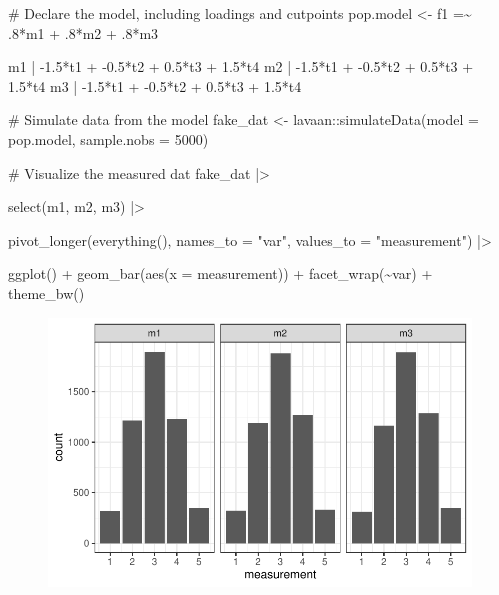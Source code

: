 \documentclass[
  letterpaper,
  DIV=11,
  numbers=noendperiod]{scrreprt}
\newenvironment{Shaded}{\begin{snugshade}}{\end{snugshade}}
\newcommand{\AttributeTok}[1]{\textcolor[rgb]{0.40,0.45,0.13}{#1}}
\newcommand{\CommentTok}[1]{\textcolor[rgb]{0.37,0.37,0.37}{#1}}
\newcommand{\DecValTok}[1]{\textcolor[rgb]{0.68,0.00,0.00}{#1}}
\newcommand{\FunctionTok}[1]{\textcolor[rgb]{0.28,0.35,0.67}{#1}}
\newcommand{\NormalTok}[1]{\textcolor[rgb]{0.00,0.23,0.31}{#1}}
\newcommand{\OtherTok}[1]{\textcolor[rgb]{0.00,0.23,0.31}{#1}}
\newcommand{\SpecialCharTok}[1]{\textcolor[rgb]{0.37,0.37,0.37}{#1}}
\newcommand{\StringTok}[1]{\textcolor[rgb]{0.13,0.47,0.30}{#1}}
\begin{document}
\begin{Shaded}
\begin{Highlighting}[]
\CommentTok{\# Declare the model, including loadings and cutpoints}
\NormalTok{pop.model }\OtherTok{\textless{}{-}} \StringTok{\textquotesingle{} }
\StringTok{  f1 =\textasciitilde{} .8*m1 + .8*m2 + .8*m3}

\StringTok{  m1 | {-}1.5*t1 + {-}0.5*t2 + 0.5*t3 + 1.5*t4}
\StringTok{  m2 | {-}1.5*t1 + {-}0.5*t2 + 0.5*t3 + 1.5*t4}
\StringTok{  m3 | {-}1.5*t1 + {-}0.5*t2 + 0.5*t3 + 1.5*t4}
\StringTok{\textquotesingle{}}

\CommentTok{\# Simulate data from the model}
\NormalTok{fake\_dat }\OtherTok{\textless{}{-}}\NormalTok{ lavaan}\SpecialCharTok{::}\FunctionTok{simulateData}\NormalTok{(}\AttributeTok{model =}\NormalTok{ pop.model, }\AttributeTok{sample.nobs =} \DecValTok{5000}\NormalTok{)}

\CommentTok{\# Visualize the measured dat}
\NormalTok{fake\_dat }\SpecialCharTok{|\textgreater{}}

  \FunctionTok{select}\NormalTok{(m1, m2, m3) }\SpecialCharTok{|\textgreater{}} 
  
  \FunctionTok{pivot\_longer}\NormalTok{(}\FunctionTok{everything}\NormalTok{(), }\AttributeTok{names\_to =} \StringTok{"var"}\NormalTok{, }\AttributeTok{values\_to =} \StringTok{"measurement"}\NormalTok{) }\SpecialCharTok{|\textgreater{}}

  \FunctionTok{ggplot}\NormalTok{() }\SpecialCharTok{+}
  \FunctionTok{geom\_bar}\NormalTok{(}\FunctionTok{aes}\NormalTok{(}\AttributeTok{x =}\NormalTok{ measurement)) }\SpecialCharTok{+}
  \FunctionTok{facet\_wrap}\NormalTok{(}\SpecialCharTok{\textasciitilde{}}\NormalTok{var) }\SpecialCharTok{+}
  \FunctionTok{theme\_bw}\NormalTok{()}
\end{Highlighting}
\end{Shaded}

\begin{figure}[H]

{\centering \includegraphics{./simulating-cfa-data_files/figure-pdf/unnamed-chunk-2-1.pdf}

}

\end{figure}
\end{document}
